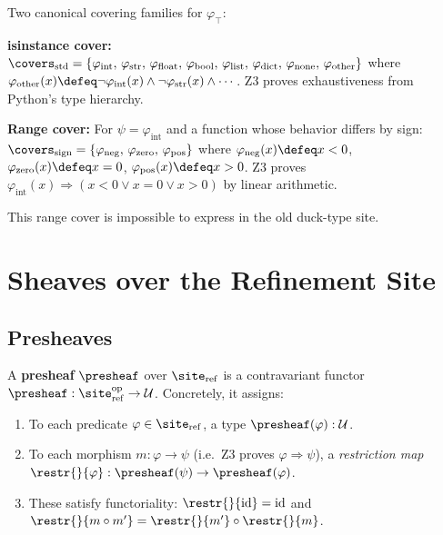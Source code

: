\begin{example}
\label{ex:standard-range-cover}
Two canonical covering families for $\varphi_\top$:

\medskip\noindent
\textbf{isinstance cover:}
$\covers_{\mathrm{std}} = \{\varphi_{\mathrm{int}},\,
\varphi_{\mathrm{str}},\,\varphi_{\mathrm{float}},\,\varphi_{\mathrm{bool}},\,
\varphi_{\mathrm{list}},\,\varphi_{\mathrm{dict}},\,\varphi_{\mathrm{none}},\,
\varphi_{\mathrm{other}}\}$
where $\varphi_{\mathrm{other}}(x) \defeq \neg\varphi_{\mathrm{int}}(x)
\wedge \neg\varphi_{\mathrm{str}}(x) \wedge \cdots$.  Z3 proves exhaustiveness
from Python's type hierarchy.

\medskip\noindent
\textbf{Range cover:}  For $\psi = \varphi_{\mathrm{int}}$ and a function
whose behavior differs by sign:
$\covers_{\mathrm{sign}} = \{\varphi_{\mathrm{neg}},\, \varphi_{\mathrm{zero}},\,
\varphi_{\mathrm{pos}}\}$
where $\varphi_{\mathrm{neg}}(x) \defeq x < 0$,
$\varphi_{\mathrm{zero}}(x) \defeq x = 0$,
$\varphi_{\mathrm{pos}}(x) \defeq x > 0$.  Z3 proves
$\varphi_{\mathrm{int}}(x) \Rightarrow (x<0 \vee x=0 \vee x>0)$
by linear arithmetic.

\medskip\noindent
This range cover is impossible to express in the old duck-type site.
\end{example}


\section{Sheaves over the Refinement Site}
\label{sec:sheaves-refinement}

\subsection{Presheaves}

\begin{definition}
\label{def:refinement-presheaf}
A \textbf{presheaf} $\presheaf$ over $\site_{\mathrm{ref}}$ is a contravariant
functor $\presheaf : \site_{\mathrm{ref}}^{\mathrm{op}} \to \mathcal{U}$.
Concretely, it assigns:
\begin{enumerate}
\item To each predicate $\varphi \in \site_{\mathrm{ref}}$, a type
  $\presheaf(\varphi) : \mathcal{U}$.
\item To each morphism $m : \varphi \to \psi$ (i.e.\ Z3 proves
  $\varphi \Rightarrow \psi$), a \emph{restriction map}
  $\restr{}{\varphi} : \presheaf(\psi) \to \presheaf(\varphi)$.
\item These satisfy functoriality:
  $\restr{}{\mathrm{id}} = \mathrm{id}$ and
  $\restr{}{m \circ m'} = \restr{}{m'} \circ \restr{}{m}$.
\end{enumerate}
\end{definition}

